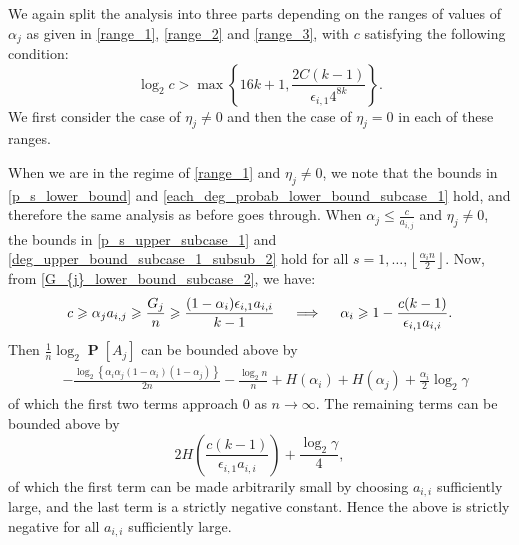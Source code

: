 \documentclass[11pt,reqno]{amsart}
\theoremstyle{definition}
\theoremstyle{remark}
\theoremstyle{conjecture}
\DeclareMathOperator{\Prob}{\mathbf{P}}
\begin{document}
We again split the analysis into three parts depending on the ranges of values of $\alpha_{j}$ as given in \eqref{range_1}, \eqref{range_2} and \eqref{range_3}, with $c$ satisfying the following condition:
\begin{equation}\label{cond_c_subcase_2}
\log_{2}c > \max\left\{16k + 1, \frac{2 C(k-1)}{\epsilon_{i,1} 4^{8k}}\right\}.
\end{equation}
We first consider the case of $\eta_{j} \neq 0$ and then the case of $\eta_{j} = 0$  in each of these ranges.

When we are in the regime of \eqref{range_1} and $\eta_{j} \neq 0$, we note that the bounds in \eqref{p_s_lower_bound} and \eqref{each_deg_probab_lower_bound_subcase_1} hold, and therefore the same analysis as before goes through. When $\alpha_{j} \leqslant \frac{c}{a_{i,j}}$ and $\eta_{j} \neq 0$, the bounds in \eqref{p_s_upper_subcase_1} and \eqref{deg_upper_bound_subcase_1_subsub_2} hold for all $s = 1, \ldots, \left\lfloor\frac{\alpha_{i} n}{2}\right\rfloor$. Now, from \eqref{G_{j}_lower_bound_subcase_2}, we have:
\begin{equation}\label{alpha_{i}_lower_bound_subcase_2_subsub_2}
c \geqslant \alpha_{j} a_{i,j} \geqslant \frac{G_{j}}{n} \geqslant \frac{(1-\alpha_{i}) \epsilon_{i,1} a_{i,i}}{k-1} \quad \implies \quad \alpha_{i} \geqslant 1 - \frac{c(k-1)}{\epsilon_{i,1} a_{i,i}}.
\end{equation}
Then $\frac{1}{n} \log_{2} \Prob[A_{j}]$ can be bounded above by
\begin{align}
& -\frac{\log_{2}\left\{\alpha_{i} \alpha_{j} (1-\alpha_{i}) (1-\alpha_{j})\right\}}{2n} - \frac{\log_{2} n}{n} + H(\alpha_{i}) + H(\alpha_{j}) + \frac{\alpha_{i}}{2} \log_{2} \gamma \nonumber
\end{align}
of which the first two terms approach $0$ as $n \rightarrow \infty$. The remaining terms can be bounded above by
\begin{equation}
2H\left(\frac{c (k-1)}{\epsilon_{i,1} a_{i,i}}\right) + \frac{\log_{2} \gamma}{4}, \nonumber
\end{equation}
of which the first term can be made arbitrarily small by choosing $a_{i,i}$ sufficiently large, and the last term is a strictly negative constant. Hence the above is strictly negative for all $a_{i,i}$ sufficiently large.
\end{document}
